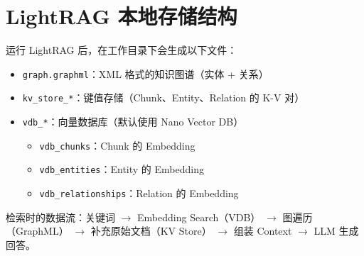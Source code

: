 \section{LightRAG 本地存储结构}

运行 LightRAG 后，在工作目录下会生成以下文件：

\begin{itemize}
    \item \texttt{graph.graphml}：XML 格式的知识图谱（实体 + 关系）
    \item \texttt{kv\_store\_*}：键值存储（Chunk、Entity、Relation 的 K-V 对）
    \item \texttt{vdb\_*}：向量数据库（默认使用 Nano Vector DB）
    \begin{itemize}
        \item \texttt{vdb\_chunks}：Chunk 的 Embedding
        \item \texttt{vdb\_entities}：Entity 的 Embedding
        \item \texttt{vdb\_relationships}：Relation 的 Embedding
    \end{itemize}
\end{itemize}

检索时的数据流：关键词 $\rightarrow$ Embedding Search（VDB） $\rightarrow$ 图遍历（GraphML） $\rightarrow$ 补充原始文档（KV Store） $\rightarrow$ 组装 Context $\rightarrow$ LLM 生成回答。

